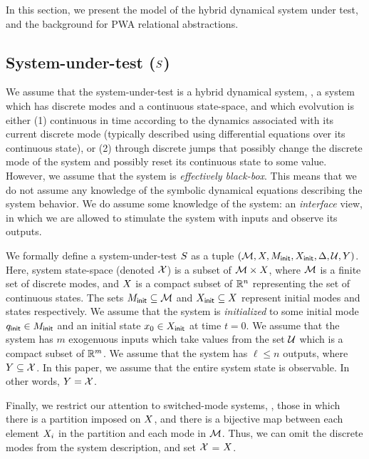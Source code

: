 In this section, we present the model of the hybrid dynamical system
under test, and the background for PWA relational abstractions.


\subsection{System-under-test ($S$)}

We assume that the system-under-test is a hybrid dynamical system, \ie, a
system which has discrete modes and a continuous state-space, and which
evolvution is either (1) continuous in time according to the dynamics
associated with its current discrete mode (typically described using
differential equations over its continuous state), or (2) through
discrete jumps that possibly change the discrete mode of the system and
possibly reset its continuous state to some value.  However, we assume
that the system is {\em effectively black-box}. This means that we do not
assume any knowledge of the symbolic dynamical equations describing the
system behavior. We do assume some knowledge of the system: an {\em
interface} view, in which we are allowed to stimulate the system with
inputs and observe its outputs.

We formally define a system-under-test $S$ as a tuple $(\mathcal{M},
X, M_{\mathsf{init}}, X_{\mathsf{init}}, \Delta, \mathcal{U}, Y)$.
Here, system state-space (denoted $\mathcal{X}$) is a subset of
$\mathcal{M} \times X$, where $\mathcal{M}$ is a finite set of
discrete modes, and $X$ is a compact subset of $\mathbb{R}^n$
representing the set of continuous states.  The sets $M_{\mathsf{init}}
\subseteq \mathcal{M}$ and $X_{\mathsf{init}} \subseteq X$ represent
initial modes and states respectively.  We assume that the system is
{\em initialized} to some initial mode $q_{\mathsf{init}} \in M_{\mathsf{init}}$ and
an initial state $x_0 \in X_{\mathsf{init}}$ at time $t=0$.  We
assume that the system has $m$ exogenuous inputs which take values
from the set $\mathcal{U}$ which is a compact subset of $\mathbb{R}^m$. We
assume that the system has $\ell \le n$ outputs, where $Y
\subseteq \mathcal{X}$. In this paper, we assume that the entire
system state is observable.  In other words, $Y =
\mathcal{X}$.

Finally, we restrict our attention to switched-mode systems, \ie, those in
which there is a partition imposed on $X$, and there is a
bijective map between each element $X_i$ in the partition and
each mode in $\mathcal{M}$. Thus, we can omit the discrete modes from the
system description, and set $\mathcal{X}$ = $X$.

